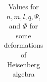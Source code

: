 \documentclass[12pt,a4paper]{article}
\theoremstyle{plain}
\theoremstyle{definition}
\theoremstyle{remark}
\begin{document}
\begin{landscape}
\begin{table}[ht]
\begin{tabular}{|c|c|c|c|c|c|c|c|}
\end{tabular}
\caption{Values for $n, m, l, q, \Psi$, and $\Phi$ for some deformations of Heisenberg algebra}
\label{tab:heisenberg_algebras}
\end{table}
\end{landscape}



\end{document}
